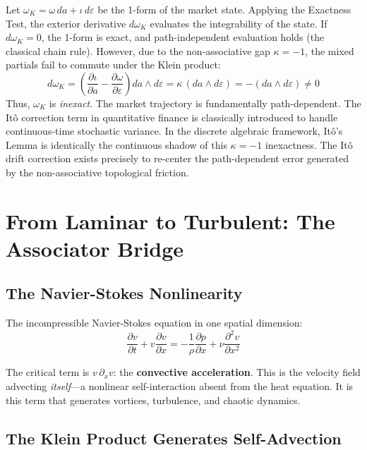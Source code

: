 Let $\omega_K = \omega \,da + \iota \,d\varepsilon$ be the 1-form of the market state. Applying the Exactness Test, the exterior derivative $d\omega_K$ evaluates the integrability of the state. If $d\omega_K = 0$, the 1-form is exact, and path-independent evaluation holds (the classical chain rule). However, due to the non-associative gap $\kappa = -1$, the mixed partials fail to commute under the Klein product:
\begin{equation}
    d\omega_K = \left(\frac{\partial \iota}{\partial a} - \frac{\partial \omega}{\partial \varepsilon}\right) da \wedge d\varepsilon = \kappa \, (da \wedge d\varepsilon) = -(da \wedge d\varepsilon) \neq 0
\end{equation}
Thus, $\omega_K$ is \emph{inexact}. The market trajectory is fundamentally path-dependent. The It\^o correction term in quantitative finance is classically introduced to handle continuous-time stochastic variance. In the discrete algebraic framework, It\^o's Lemma is identically the continuous shadow of this $\kappa = -1$ inexactness. The It\^o drift correction exists precisely to re-center the path-dependent error generated by the non-associative topological friction.

\section{From Laminar to Turbulent: The Associator Bridge}

\subsection{The Navier-Stokes Nonlinearity}

The incompressible Navier-Stokes equation in one spatial dimension:
\begin{equation}\label{eq:ns_1d}
    \frac{\partial v}{\partial t} + v\frac{\partial v}{\partial x} = -\frac{1}{\rho}\frac{\partial p}{\partial x} + \nu \frac{\partial^2 v}{\partial x^2}
\end{equation}

The critical term is $v\,\partial_x v$: the \textbf{convective acceleration}. This is the velocity field advecting \emph{itself}---a nonlinear self-interaction absent from the heat equation. It is this term that generates vortices, turbulence, and chaotic dynamics.

\subsection{The Klein Product Generates Self-Advection}

